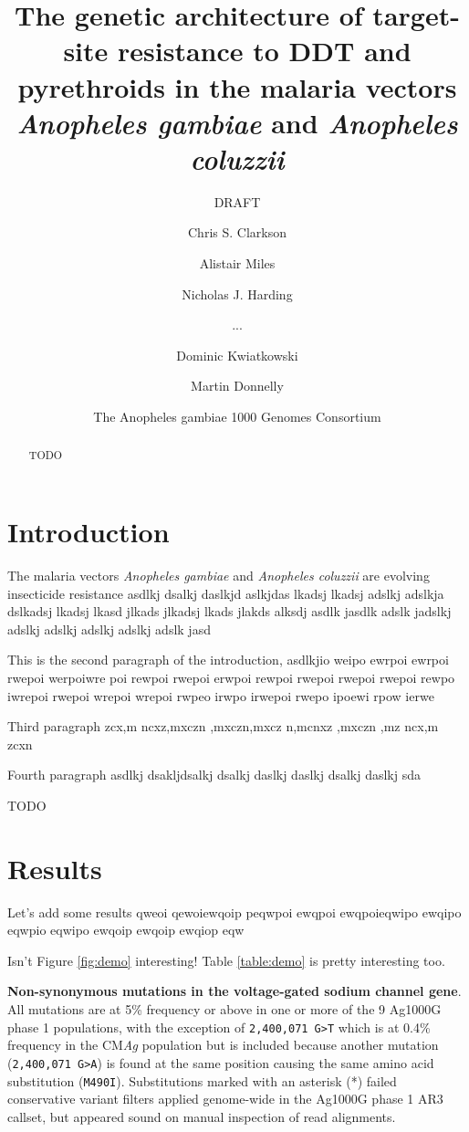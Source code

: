 \documentclass[a4paper,10pt,abstracton]{scrartcl}
\title{The genetic architecture of target-site resistance to DDT and
  pyrethroids in the malaria vectors \emph{Anopheles gambiae} and
  \emph{Anopheles coluzzii}}
\subtitle{DRAFT}
\author{
	Chris S. Clarkson
	\and 
	Alistair Miles
	\and
	Nicholas J. Harding
        \and
        ...
	\and
	Dominic Kwiatkowski
	\and
	Martin Donnelly
	\and
	The Anopheles gambiae 1000 Genomes Consortium
}
\begin{document}
\maketitle

\begin{abstract}

TODO

\end{abstract}

\section*{Introduction}

The malaria vectors \emph{Anopheles gambiae} and \emph{Anopheles
  coluzzii} are evolving insecticide resistance asdlkj dsalkj daslkjd
aslkjdas lkadsj lkadsj adslkj adslkja dslkadsj lkadsj lkasd jlkads
jlkadsj lkads jlakds alksdj asdlk jasdlk adslk jadslkj adslkj adslkj
adslkj adslkj adslk jasd

This is the second paragraph of the introduction, asdlkjio weipo
ewrpoi ewrpoi rwepoi werpoiwre poi rewpoi rwepoi erwpoi rewpoi rwepoi
rwepoi rwepoi rewpo iwrepoi rwepoi wrepoi wrepoi rwpeo irwpo irwepoi
rwepo ipoewi rpow ierwe

Third paragraph zcx,m ncxz,mxczn ,mxczn,mxcz n,mcnxz ,mxczn ,mz ncx,m
zcxn

Fourth paragraph asdlkj dsakljdsalkj dsalkj daslkj daslkj dsalkj
daslkj sda

TODO

\section*{Results}

Let's add some results qweoi qewoiewqoip peqwpoi ewqpoi ewqpoieqwipo
ewqipo eqwpio eqwipo ewqoip ewqoip ewqiop eqw

Isn't Figure \ref{fig:demo} interesting! Table \ref{table:demo} is
pretty interesting too.

\begin{landscape}
\begin{table}[h]
  \small
  \centering
  
  \caption{\textbf{Non-synonymous mutations in the voltage-gated
      sodium channel gene}. All mutations are at 5\% frequency or
    above in one or more of the 9 Ag1000G phase 1 populations, with
    the exception of \texttt{2,400,071 G>T} which is at 0.4\%
    frequency in the CM\emph{Ag} population but is included because
    another mutation (\texttt{2,400,071 G>A}) is found at the same
    position causing the same amino acid substitution
    (\texttt{M490I}). Substitutions marked with an asterisk (*) failed
    conservative variant filters applied genome-wide in the Ag1000G
    phase 1 AR3 callset, but appeared sound on manual inspection of
    read alignments.}
  \label{table:variants_missense}
\end{table}
\end{landscape}
\end{document}
